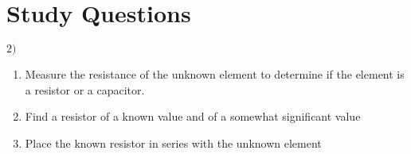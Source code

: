 \documentclass{article}
\begin{document}
\section*{Study Questions}

$2)$
\begin{enumerate}
\item Measure the resistance of the unknown element to determine if the element is
a resistor or a capacitor.
\item Find a resistor of a known value and of a somewhat significant value
\item Place the known resistor in series with the unknown element

\end{enumerate}


\end{document}
